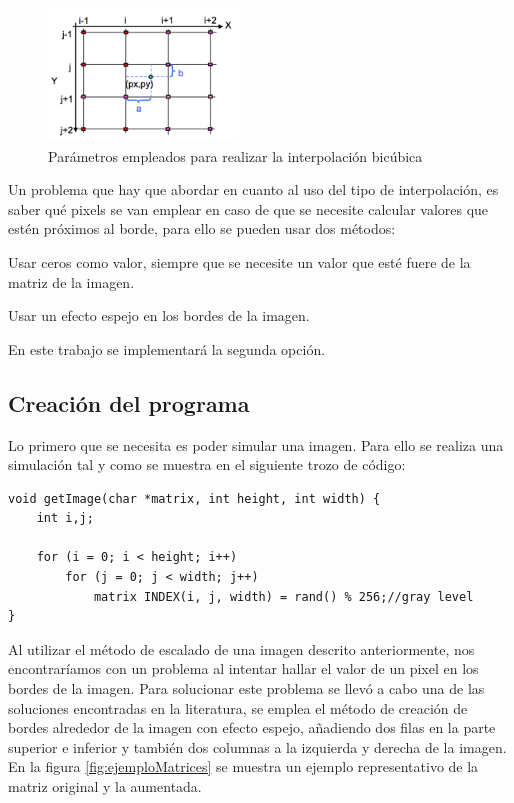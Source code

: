 \documentclass{article}
\begin{document}
\begin{figure}[h]
  \centering
    \includegraphics[width=0.45\textwidth]{img/interpolation.png}
  \caption{Parámetros empleados para realizar la interpolación bicúbica}
  \label{fig:interpolation}
\end{figure}



Un problema que hay que abordar en cuanto al uso del tipo de interpolación, es saber qué pixels se van emplear en caso de que se necesite calcular valores que estén próximos al borde, para ello se pueden usar dos métodos:{\setlength{\parskip}{0mm}
\begin{enumerate}{\setlength{\parskip}{0mm}
	\item Usar ceros como valor, siempre que se necesite un valor que esté fuere de la matriz de la imagen.
	\item Usar un efecto espejo en los bordes de la imagen.
}\end{enumerate}
}En este trabajo se implementará la segunda opción.

\subsection{Creación del programa}
Lo primero que se necesita es poder simular una imagen. Para ello se realiza una simulación tal y como se muestra en el siguiente trozo de código:

\begin{lstlisting}[style=C]
void getImage(char *matrix, int height, int width) {
	int i,j;
	 
	for (i = 0; i < height; i++)
		for (j = 0; j < width; j++)
			matrix INDEX(i, j, width) = rand() % 256;//gray level
}
\end{lstlisting}

Al utilizar el método de escalado de una imagen descrito anteriormente, nos encontraríamos con un problema al intentar hallar el valor de un pixel en los bordes de la imagen. Para solucionar este problema se llevó a cabo una de las soluciones encontradas en la literatura, se emplea el método de creación de bordes alrededor de la imagen con efecto espejo, añadiendo dos filas en la parte superior e inferior y también dos columnas a la izquierda y derecha de la imagen. 
En la figura \ref{fig:ejemploMatrices} se muestra un ejemplo representativo de la matriz original y la aumentada.
\end{document}
